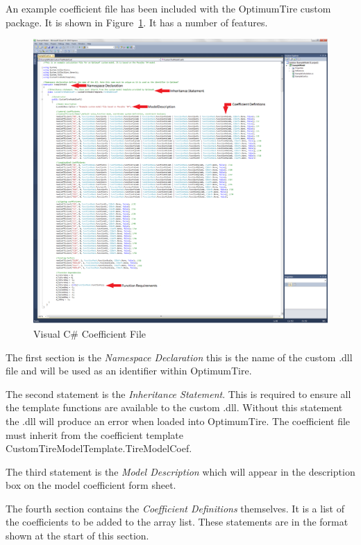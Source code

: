 An example coefficient file has been included with the OptimumTire custom package. It is shown in Figure~\ref{fig:CoefFileVC}. It has a number of features. 

 \begin{figure}[H]
	\centering
		\includegraphics[width=1.0\textwidth]{CoefFileVC.png}
	\caption{Visual C\# Coefficient File}
	\label{fig:CoefFileVC}
\end{figure}

The first section is the \textsl{\textquotedbl Namespace Declaration\textquotedbl} this is the name of the custom .dll file and will be used as an identifier within OptimumTire.

The second statement is the \textsl{\textquotedbl Inheritance Statement\textquotedbl}. This is required to ensure all the template functions are available to the custom .dll. Without this statement the .dll will produce an error when loaded into OptimumTire. The coefficient file must inherit from the coefficient template CustomTireModelTemplate.TireModelCoef.

The third statement is the \textsl{\textquotedbl Model Description\textquotedbl} which will appear in the description box on the model coefficient form sheet.

The fourth section contains the \textsl{\textquotedbl Coefficient Definitions\textquotedbl} themselves. It is a list of the coefficients to be added to the array list. These statements are in the format shown at the start of this section.

